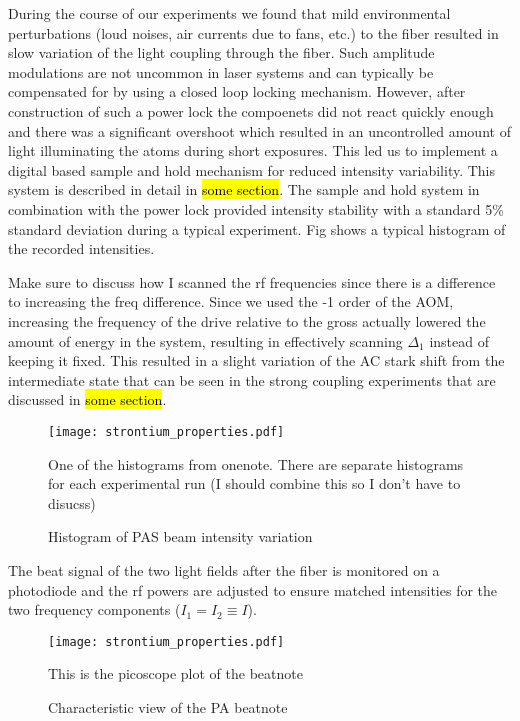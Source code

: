 During the course of our experiments we found that mild environmental perturbations (loud noises, air currents due to fans, etc.) to the fiber resulted in slow variation of the light coupling through the fiber. Such amplitude modulations are not uncommon in laser systems and can typically be  compensated for by using a closed loop locking mechanism. However, after construction of such a power lock the compoenets did not react quickly enough and there was a significant overshoot which resulted in an uncontrolled amount of light illuminating the atoms during short exposures. This led us to implement a digital based sample and hold mechanism for reduced intensity variability. This system is described in detail in \hl{some section}. The sample and hold system in combination with the power lock provided intensity stability with a standard 5\% standard deviation during a typical experiment. Fig shows a typical histogram of the recorded intensities. 

Make sure to discuss how I scanned the rf frequencies since there is a difference to increasing the freq difference. Since we used the -1 order of the AOM, increasing the frequency of the drive relative to the gross actually lowered the amount of energy in the system, resulting in effectively scanning $\Delta_1$ instead of keeping it fixed. This resulted in a slight variation of the AC stark shift from the intermediate state that can be seen in the strong coupling experiments that are discussed in \hl{some section}. 

\begin{figure} \label{fig:ch3_pas_histogram}
	\centerline{
	\texttt{[image: strontium\_properties.pdf]}}
	\caption{Histogram of PAS beam intensity variation}{One of the histograms from onenote. There are separate histograms for each experimental run (I should combine this so I don't have to disucss)}
\end{figure} 

The beat signal of the two light fields after the fiber is monitored on a photodiode and the rf powers are adjusted to ensure matched intensities for the two frequency components ($I_1 = I_2 \equiv I$).

\begin{figure} \label{fig:ch3_pas_light_balance}
	\centerline{
	\texttt{[image: strontium\_properties.pdf]}}
	\caption{Characteristic view of the PA beatnote}{This is the picoscope plot of the beatnote}
\end{figure} 


